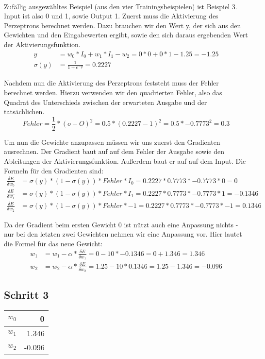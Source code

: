 \documentclass[a4paper]{article}
\begin{document}
\paragraph{}
Zufällig ausgewähltes Beispiel (aus den vier Trainingsbeispielen) ist Beispiel 3. Input ist also 0 und 1, sowie Output 1.
Zuerst muss die Aktivierung des Perzeptrons berechnet werden. Dazu brauchen wir den Wert y, der sich aus den Gewichten und den Eingabewerten ergibt, sowie den sich daraus ergebenden Wert der Aktivierungsfunktion.
\begin{align*}
	y &= w_0 * I_0 + w_1 * I_1 - w_2 = 0 * 0 + 0 * 1 - 1.25 = -1.25 \\
	\sigma(y) &= \frac{1}{1 + e^{-y}} = 0.2227
\end{align*}

Nachdem nun die Aktivierung des Perzeptrons feststeht muss der Fehler berechnet werden. Hierzu verwenden wir den quadrierten Fehler, also das Quadrat des Unterschieds zwischen der erwarteten Ausgabe und der tatsächlichen.
\[
	Fehler = \frac{1}{2} * (o - O)^2 = 0.5 * (0.2227 - 1)^2 = 0.5 * -0.7773^2 = 0.3
\]

Um nun die Gewichte anzupassen müssen wir uns zuerst den Gradienten ausrechnen.
Der Gradient baut auf auf dem Fehler der Ausgabe sowie den Ableitungen der Aktivierungsfunktion. Außerdem baut er auf auf dem Input. Die Formeln für den Gradienten sind:
\begin{align*}
	\frac{\delta E}{\delta w_0} &= \sigma(y) * (1 - \sigma(y)) * Fehler * I_0 = 0.2227 * 0.7773 * -0.7773 * 0 = 0 \\
	\frac{\delta E}{\delta w_1} &= \sigma(y) * (1 - \sigma(y)) * Fehler * I_1 = 0.2227 * 0.7773 * -0.7773 * 1 = -0.1346 \\
	\frac{\delta E}{\delta w_2} &= \sigma(y) * (1 - \sigma(y)) * Fehler * -1 = 0.2227 * 0.7773 * -0.7773 * -1 = 0.1346
\end{align*}

Da der Gradient beim ersten Gewicht 0 ist nützt auch eine Anpassung nichts - nur bei den letzten zwei Gewichten nehmen wir eine Anpassung vor. Hier lautet die Formel für das neue Gewicht:
\begin{align*}
	w_1 &= w_1 - \alpha * \frac{\delta E}{\delta w_1} = 0 - 10 * -0.1346 = 0 + 1.346 = 1.346 \\
	w_2 &= w_2 - \alpha * \frac{\delta E}{\delta w_2} = 1.25 - 10 * 0.1346 = 1.25 - 1.346 = -0.096
\end{align*}

\subsection{Schritt 3}
\begin{tabular}{|l|r|}
	\hline
	$w_0$ & 0 \\\hline
	$w_1$ & 1.346 \\\hline
	$w_2$ & -0.096 \\\hline
\end{tabular}
\end{document}
